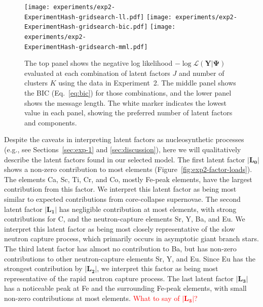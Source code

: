 \documentclass[twocolumn]{aastex62}
\newcommand{\todo}[1]{\textcolor{red}{#1}}
\newcommand{\vect}[1]{\boldsymbol{\mathbf{#1}}}
\renewcommand{\vec}[1]{\vect{#1}}
\newcommand{\data}{\textbf{Y}}
\newcommand{\NumLatentFactors}{J}
\newcommand{\NumComponents}{K}
\newcommand{\ExperimentHash}{96ff8}
\begin{document}
\begin{figure}
	\texttt{[image: experiments/exp2-\\ExperimentHash-gridsearch-ll.pdf]}
	\texttt{[image: experiments/exp2-\\ExperimentHash-gridsearch-bic.pdf]}
	\texttt{[image: experiments/exp2-\\ExperimentHash-gridsearch-mml.pdf]}
    \caption{The top panel shows the negative log likelihood 
			 $-\log{\mathcal{L}\left(\data|\vec\Psi\right)}$ 
			 evaluated at each combination of latent factors 
			 $\NumLatentFactors$ and number of clusters 
			 $\NumComponents$ using the \citet{Barklem:2005}
			 data in Experiment~2.  The middle panel shows 
			 the BIC (Eq.~\ref{eq:bic}) for those 
			 combinations, and the lower panel shows the 
			 message length. The white marker indicates the
			 lowest value in each panel, showing the
			 preferred number of latent factors and components.}
    \label{fig:exp2-gridsearch-contours}
\end{figure}

Despite the caveats in interpreting latent factors as nucleosynthetic processes
(e.g., see Sections~\ref{sec:exp-1} and \ref{sec:discussion}), here we will
qualitatively describe the latent factors found in our selected model.
The first latent factor $|\mathbf{L_0}|$ shows a non-zero contribution to most
elements (Figure~\ref{fig:exp2-factor-loads}). The elements Ca, Sc, Ti, Cr, and Co, mostly
Fe-peak elements, have the largest contribution from this factor. We interpret this latent
factor as being most similar to expected contributions from core-collapse supernovae.
The second latent factor $|\mathbf{L_1}|$ has negligible contribution at most elements,
with strong contributions for C, and the neutron-capture elements Sr, Y, Ba, and Eu. We
interpret this latent factor as being most closely representative of the slow neutron
capture process, which primarily occurs in asymptotic giant branch stars. The third latent factor has almost no contribution to Ba, but has
non-zero contributions to other neutron-capture elements Sr, Y, and Eu. Since Eu has
the strongest contribution by $|\mathbf{L_2}|$, we interpret this factor as being most
representative of the rapid neutron capture process. The last latent factor $|\mathbf{L_3}|$
has a noticeable peak at Fe and the surrounding Fe-peak elements, with small non-zero contributions at most elements. \todo{What to say of $|\mathbf{L_3}|$?}
\end{document}
